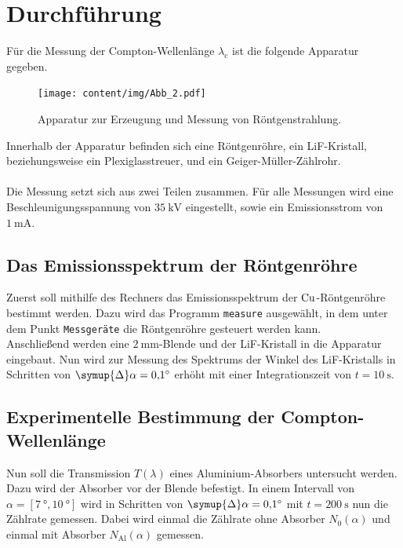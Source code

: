 \section{Durchführung}
\label{sec:durchführung}

    Für die Messung der Compton-Wellenlänge $\lambda_\text{c}$ ist die folgende Apparatur gegeben.
    \begin{figure}[H]
        \centering
        \texttt{[image: content/img/Abb\_2.pdf]}
        \caption{Apparatur zur Erzeugung und Messung von Röntgenstrahlung. \cite{versuchsanleitung}}
        \label{fig:aufbau_röntgen}
    \end{figure}
    Innerhalb der Apparatur befinden sich eine Röntgenröhre,
    ein LiF-Kristall, beziehungsweise ein Plexiglasstreuer,
    und ein Geiger-Müller-Zählrohr.\\
    \\
    Die Messung setzt sich aus zwei Teilen zusammen.
    Für alle Messungen wird eine Beschleunigungsspannung von $\SI{35}{\kilo\volt}$ eingestellt,
    sowie ein Emissionsstrom von $\SI{1}{\milli\ampere}$.


\subsection{Das Emissionsspektrum der Röntgenröhre}

    Zuerst soll mithilfe des Rechners das Emissionsspektrum der $\ce{Cu}$-Röntgenröhre bestimmt werden.
    Dazu wird das Programm \texttt{measure} ausgewählt,
    in dem unter dem Punkt \texttt{Messgeräte} die Röntgenröhre gesteuert werden kann.\\
    Anschließend werden eine $\SI{2}{\milli\meter}$-Blende und der LiF-Kristall in die Apparatur eingebaut.
    Nun wird zur Messung des Spektrums der Winkel des LiF-Kristalls in Schritten von $\symup{\Delta}\alpha = \SI{0.1}{\degree}$ erhöht mit einer Integrationszeit von $t = \SI{10}{\second}$.


\clearpage
\subsection{Experimentelle Bestimmung der Compton-Wellenlänge}

    Nun soll die Transmission $T(\lambda)$ eines Aluminium-Absorbers untersucht werden.
    Dazu wird der Absorber vor der Blende befestigt.
    In einem Intervall von $\alpha = [\SI{7}{\degree}, \SI{10}{\degree}]$ wird in Schritten von $\symup{\Delta}\alpha = \SI{0.1}{\degree}$ mit $t = \SI{200}{\second}$ nun die Zählrate gemessen.
    Dabei wird einmal die Zählrate ohne Absorber $N_0(\alpha)$
    und einmal mit Absorber $N_\text{Al}(\alpha)$ gemessen.

